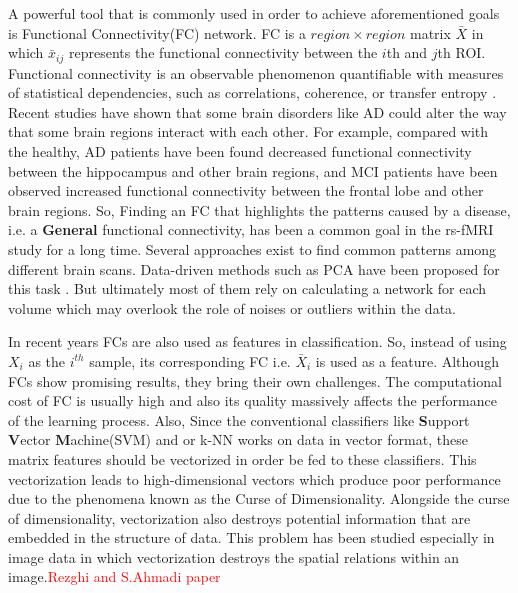 \documentclass[preprint,12pt]{elsarticle}
\begin{document}
	A powerful tool that is commonly used in order to achieve aforementioned goals is Functional Connectivity(FC) network.  FC is a $region \times region$ matrix $\bar{X}$ in which $\bar{x}_{ij}$ represents the functional connectivity between the $i$th and $j$th ROI. Functional connectivity is an observable
		phenomenon quantifiable with measures of statistical dependencies, such as correlations, coherence, or transfer entropy \cite{r38}.  Recent studies have shown that some brain disorders like AD could alter the way that some brain regions interact with each other. For example, compared with the healthy, AD patients have been found decreased functional connectivity between the hippocampus and other brain regions, and MCI patients have been observed increased functional connectivity between the frontal lobe and other brain regions\cite{r04}.
		So, Finding an FC that highlights the patterns caused by a disease, i.e. a \textbf{General} functional connectivity, has been a common goal in the rs-fMRI study for a long time. Several approaches exist to find common patterns among different brain scans. Data-driven methods such as PCA have been proposed for this task \cite{r55}. But ultimately most of them rely on calculating a network for each volume which may overlook the role of noises or outliers within the data\cite{r53,r54}. 
	
		In recent years FCs are also used as features in classification. 
		So, instead of using $X_i$ as the $i^{th}$ sample, its corresponding  FC i.e. $\bar{X}_i$ is used as a feature. Although FCs show promising results, they bring their own challenges.  The computational cost of FC is usually high and also its quality massively affects the performance of the learning process. Also, Since the conventional classifiers like \textbf{S}upport \textbf{V}ector \textbf{M}achine(SVM) and or k-NN works on data in vector format, these matrix features should be vectorized in order be fed to these classifiers.
		This vectorization leads to high-dimensional vectors which produce poor performance due to the phenomena known as the Curse of Dimensionality. Alongside the curse of dimensionality, vectorization also destroys potential information that are embedded in the structure of data. 
		This problem has been studied especially in image data in which vectorization destroys the spatial relations within an image.\textcolor{red}{Rezghi and S.Ahmadi paper}
						
\end{document}
